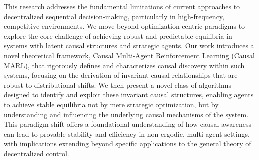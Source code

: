 This research addresses the fundamental limitations of current approaches to decentralized sequential decision-making, particularly in high-frequency, competitive environments. We move beyond optimization-centric paradigms to explore the core challenge of achieving robust and predictable equilibria in systems with latent causal structures and strategic agents.  Our work introduces a novel theoretical framework, Causal Multi-Agent Reinforcement Learning (Causal MARL), that rigorously defines and characterizes causal discovery within such systems, focusing on the derivation of invariant causal relationships that are robust to distributional shifts. We then present a novel class of algorithms designed to identify and exploit these invariant causal structures, enabling agents to achieve stable equilibria not by mere strategic optimization, but by understanding and influencing the underlying causal mechanisms of the system. This paradigm shift offers a foundational understanding of how causal awareness can lead to provable stability and efficiency in non-ergodic, multi-agent settings, with implications extending beyond specific applications to the general theory of decentralized control.